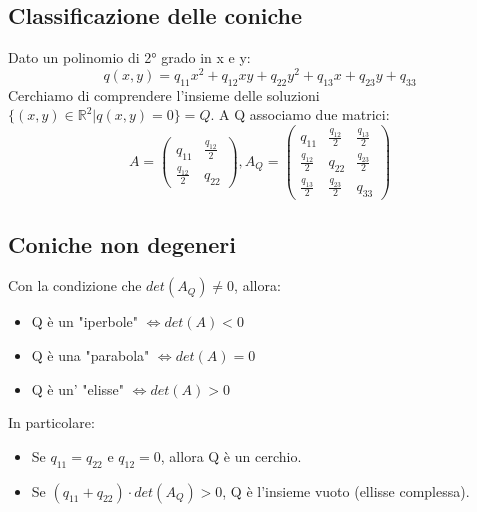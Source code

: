 \documentclass[12pt]{article}
\newenvironment{para}{\begin{adjustwidth}{13mm}{}}{\end{adjustwidth}}
\begin{document}
\begin{para}
\section{Classificazione delle coniche}
Dato un polinomio di 2° grado in x e y: $$q(x,y) = q_{11}x^2+q_{12}xy+q_{22}y^2+q_{13}x+q_{23}y+q_{33}$$
Cerchiamo di comprendere l'insieme delle soluzioni $\{(x,y) \in \mathbb{R}^2 | q(x,y)=0\} = Q$. A Q associamo due matrici: $$A = \begin{pmatrix}
    q_{11} & \frac{q_{12}}{2}\\
    \frac{q_{12}}{2} & q_{22}
\end{pmatrix}, A_Q=\begin{pmatrix}
    q_{11} & \frac{q_{12}}{2} & \frac{q_{13}}{2} \\
    \frac{q_{12}}{2} & q_{22} & \frac{q_{23}}{2} \\
    \frac{q_{13}}{2} & \frac{q_{23}}{2} & q_{33}
\end{pmatrix}$$
\subsection{Coniche non degeneri}
Con la condizione che $det(A_Q) \neq 0$, allora: 
\begin{itemize}
    \item Q è un "iperbole" $\Leftrightarrow det(A) < 0$
    \item Q è una "parabola" $\Leftrightarrow det(A) = 0$
    \item Q è un' "elisse" $\Leftrightarrow det(A) > 0$
\end{itemize}
In particolare:
\begin{itemize}
    \item Se $q_{11} = q_{22}$ e $q_{12} = 0$, allora Q è un cerchio.
    \item Se $(q_{11}+q_{22}) \cdot det(A_Q) > 0$, Q è l'insieme vuoto (ellisse complessa).
\end{itemize}

\end{para}
\end{document}

